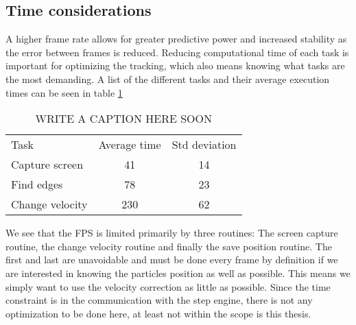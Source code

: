 \subsection{Time considerations}\label{sec:time considerations}
A higher frame rate allows for greater predictive power and increased stability as the error between frames is 
reduced. Reducing computational time of each task is important for optimizing the tracking, which also means knowing 
what tasks are the most demanding. A list of the different tasks and their average execution times can be seen in table 
\ref{tab:benchmarks}


\begin{table}[H]
 \begin{tabular}{l | c | c } 
 Task  			&  Average time & Std deviation \\
 Capture screen & 41 			& 14 \\
 Find edges 	& 78			& 23 \\
 Change velocity& 230			& 62 \\
 \end{tabular}
 \caption{WRITE A CAPTION HERE SOON}
 \label{tab:benchmarks}
\end{table}

We see that the FPS is limited primarily by three routines: The screen capture routine, the change velocity routine and finally the save position routine. The first and last are unavoidable and must be done every frame by definition if we are interested in knowing the particles position as well as possible. This means we simply want to use the velocity correction as little as possible. Since the time constraint is in the communication with the step engine, there is not any optimization to be done here, at least not within the scope is this thesis. 
